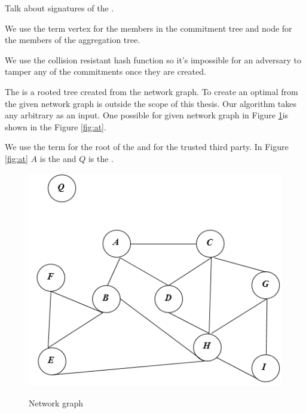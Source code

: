 	Talk about signatures of the \payloads.

	We use the term vertex for the members in the commitment tree and node for the members of the aggregation tree.
	
	We use the collision resistant hash function so it's impossible for an adversary to tamper any of the commitments once they are created.

	The \at is a rooted tree created from the network graph. To create an optimal \at from the given network graph is outside the scope of this thesis. Our algorithm takes any arbitrary \at as an input. One possible \at for given network graph in Figure \ref{fig:ng}is shown in the Figure \ref{fig:at}.

	We use the term \bs for the root of the \at and \q for the trusted third party. In Figure \ref{fig:at} $A$ is the \bs and $Q$ is the \q.
		
	\begin{figure}[hp]
		\centering
		\includegraphics[scale = 0.6]{images/network-graph.png}\\
		\caption{Network graph}
		\label{fig:ng}
	\end{figure}

